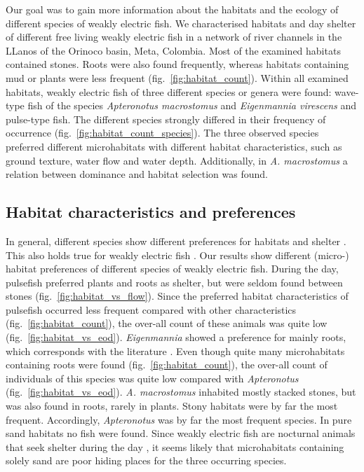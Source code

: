 
Our goal was to gain more information about the habitats and the ecology of different species of weakly electric fish. We characterised habitats and day shelter of different free living weakly electric fish in a network of river channels in the LLanos of the Orinoco basin, Meta, Colombia. Most of the examined habitats contained stones. Roots were also found frequently, whereas habitats containing mud or plants were less frequent (fig.~\ref{fig:habitat_count}). Within all examined habitats, weakly electric fish of three different species  or genera were found: wave-type fish of the species \textit{Apteronotus macrostomus} and \textit{Eigenmannia virescens} and pulse-type fish. The different species strongly differed in their frequency of occurrence (fig.~\ref{fig:habitat_count_species}). 
The three observed species preferred different microhabitats with different habitat characteristics, such as ground texture, water flow and water depth. Additionally, in \textit{A. macrostomus} a relation between dominance and habitat selection was found. 

\subsection{Habitat characteristics and preferences}

In general, different species show different preferences for habitats and shelter \citep{redsalmon1995,sherry1989redstarts,downes1998heat}. This also holds true for weakly electric fish \citep{Hopkins_74,HAGEDORN1985,lissmann1965activity}. Our results show different (micro-) habitat preferences of different species of weakly electric fish.
During the day, pulsefish preferred plants and roots as shelter, but were seldom found between stones (fig.~\ref{fig:habitat_vs_flow}). Since the preferred habitat characteristics of pulsefish occurred less frequent compared with other characteristics (fig.~\ref{fig:habitat_count}), the over-all count of these animals was quite low (fig.~\ref{fig:habitat_vs_eod}). \textit{Eigenmannia} showed a preference for mainly roots, which corresponds with the literature \citep{Hopkins_74}. Even though quite many microhabitats containing roots were found (fig.~\ref{fig:habitat_count}), the over-all count of individuals of this species was quite low compared with \textit{Apteronotus} (fig.~\ref{fig:habitat_vs_eod}). \textit{A. macrostomus} inhabited mostly stacked stones, but was also found in roots, rarely in plants. Stony habitats were by far the most frequent. Accordingly, \textit{Apteronotus} was by far the most frequent species. In pure sand habitats no fish were found. Since weakly electric fish are nocturnal animals \citep{lissmann1965activity} that seek shelter during the day \citep{Hopkins_74}, it seems likely that microhabitats containing solely sand are poor hiding places for the three occurring species.

